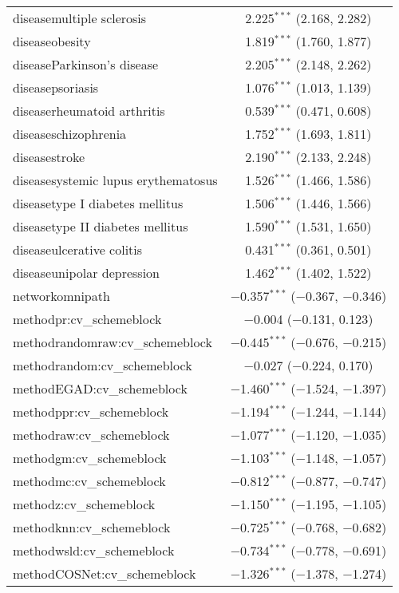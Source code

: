 \begin{table}[!htbp]
\begin{tabular}{@{\extracolsep{5pt}}lc}
  diseasemultiple sclerosis & 2.225$^{***}$ (2.168, 2.282) \\ 
  diseaseobesity & 1.819$^{***}$ (1.760, 1.877) \\ 
  diseaseParkinson's disease & 2.205$^{***}$ (2.148, 2.262) \\ 
  diseasepsoriasis & 1.076$^{***}$ (1.013, 1.139) \\ 
  diseaserheumatoid arthritis & 0.539$^{***}$ (0.471, 0.608) \\ 
  diseaseschizophrenia & 1.752$^{***}$ (1.693, 1.811) \\ 
  diseasestroke & 2.190$^{***}$ (2.133, 2.248) \\ 
  diseasesystemic lupus erythematosus & 1.526$^{***}$ (1.466, 1.586) \\ 
  diseasetype I diabetes mellitus & 1.506$^{***}$ (1.446, 1.566) \\ 
  diseasetype II diabetes mellitus & 1.590$^{***}$ (1.531, 1.650) \\ 
  diseaseulcerative colitis & 0.431$^{***}$ (0.361, 0.501) \\ 
  diseaseunipolar depression & 1.462$^{***}$ (1.402, 1.522) \\ 
  networkomnipath & $-$0.357$^{***}$ ($-$0.367, $-$0.346) \\ 
  methodpr:cv\_schemeblock & $-$0.004 ($-$0.131, 0.123) \\ 
  methodrandomraw:cv\_schemeblock & $-$0.445$^{***}$ ($-$0.676, $-$0.215) \\ 
  methodrandom:cv\_schemeblock & $-$0.027 ($-$0.224, 0.170) \\ 
  methodEGAD:cv\_schemeblock & $-$1.460$^{***}$ ($-$1.524, $-$1.397) \\ 
  methodppr:cv\_schemeblock & $-$1.194$^{***}$ ($-$1.244, $-$1.144) \\ 
  methodraw:cv\_schemeblock & $-$1.077$^{***}$ ($-$1.120, $-$1.035) \\ 
  methodgm:cv\_schemeblock & $-$1.103$^{***}$ ($-$1.148, $-$1.057) \\ 
  methodmc:cv\_schemeblock & $-$0.812$^{***}$ ($-$0.877, $-$0.747) \\ 
  methodz:cv\_schemeblock & $-$1.150$^{***}$ ($-$1.195, $-$1.105) \\ 
  methodknn:cv\_schemeblock & $-$0.725$^{***}$ ($-$0.768, $-$0.682) \\ 
  methodwsld:cv\_schemeblock & $-$0.734$^{***}$ ($-$0.778, $-$0.691) \\ 
  methodCOSNet:cv\_schemeblock & $-$1.326$^{***}$ ($-$1.378, $-$1.274) \\ 

\end{tabular}
\end{table}
